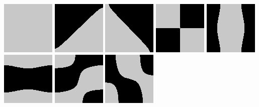 \includegraphics{o/chladni_001.png}
\includegraphics{o/chladni_002.png}
\includegraphics{o/chladni_003.png}
\includegraphics{o/chladni_004.png}
\includegraphics{o/chladni_005.png}
\includegraphics{o/chladni_006.png}
\includegraphics{o/chladni_007.png}
\includegraphics{o/chladni_008.png}

